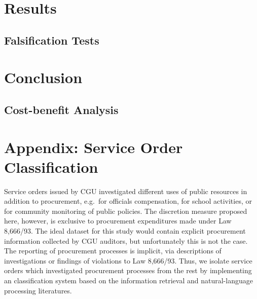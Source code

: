 \documentclass[11pt]{article}
\begin{document}
\section{Results} \label{sec:result}

\subsection{Falsification Tests} \label{subsec:discussion}

\section{Conclusion} \label{sec:conclusion}

\subsection{Cost-benefit Analysis} \label{subsec:cba}


\onehalfspacing
\setlength\bibsep{0pt}



\clearpage







\clearpage

\appendix
\section{Appendix: Service Order Classification} \label{sec:appendixA}

Service orders issued by CGU investigated different uses of public resources in addition to procurement, e.g.~for officials compensation, for school activities, or for community monitoring of public policies. The discretion measure proposed here, however, is exclusive to procurement expenditures made under Law 8,666/93. The ideal dataset for this study would contain explicit procurement information collected by CGU auditors, but unfortunately this is not the case. The reporting of procurement processes is implicit, via descriptions of investigations or findings of violations to Law 8,666/93. Thus, we isolate service orders which investigated procurement processes from the rest by implementing an classification system based on the information retrieval and natural-language processing literatures.
\end{document}
